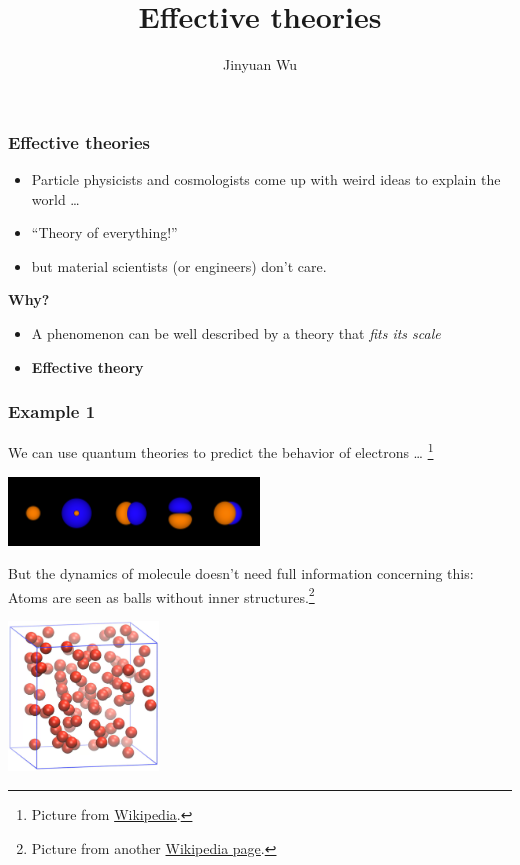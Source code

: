 \documentclass{beamer}
\title{Effective theories}
\author{Jinyuan Wu}
\newcommand{\concept}[1]{\textbf{#1}}
\begin{document}
\frame{\titlepage}

\begin{frame}
\frametitle{Effective theories}

\begin{itemize}
    \item Particle physicists and cosmologists come up with weird ideas to explain the world \dots
    \item ``Theory of everything!''
    \item but material scientists (or engineers) don't care. 
\end{itemize}

\textbf{Why?}

\begin{itemize}
    \item A phenomenon can be well described by a theory that \emph{fits its scale}
    \item \concept{Effective theory}
\end{itemize}

\end{frame}

\begin{frame}
\frametitle{Example 1}

We can use quantum theories to predict the behavior of electrons \dots%
\footnote{
    Picture from \href{https://en.wikipedia.org/wiki/Atomic\_orbital\#/media/File:Neon\_orbitals.png}{Wikipedia}.
}

\begin{center}
    \includegraphics[width=0.5\textwidth]{newtonian/Neon_orbitals.png}
\end{center}

But the dynamics of molecule doesn't need full information concerning this:
Atoms are seen as balls without inner structures.\footnote{
    Picture from another \href{https://en.wikipedia.org/wiki/File:A\_molecular\_dynamics\_simulation\_of\_argon\_gas.webm}{Wikipedia page}.
}

\begin{center}
    \includegraphics[width=0.3\textwidth]{newtonian/wiki-md.PNG}
\end{center}

\end{frame}
\end{document}
